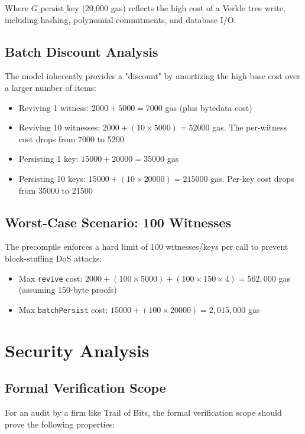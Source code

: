 \documentclass{article}
\begin{document}
Where $G\_{\text{persist\_key}}$ (20,000 gas) reflects the high cost of a Verkle tree write, including hashing, polynomial commitments, and database I/O.

\subsection{Batch Discount Analysis}

The model inherently provides a "discount" by amortizing the high base cost over a larger number of items:
\begin{itemize}
\item Reviving 1 witness: $2000 + 5000 = 7000$ gas (plus bytedata cost)
\item Reviving 10 witnesses: $2000 + (10 \times 5000) = 52000$ gas. The per-witness cost drops from 7000 to 5200
\item Persisting 1 key: $15000 + 20000 = 35000$ gas
\item Persisting 10 keys: $15000 + (10 \times 20000) = 215000$ gas. Per-key cost drops from 35000 to 21500
\end{itemize}

\subsection{Worst-Case Scenario: 100 Witnesses}

The precompile enforces a hard limit of 100 witnesses/keys per call to prevent block-stuffing DoS attacks:
\begin{itemize}
\item Max \texttt{revive} cost: $2000 + (100 \times 5000) + (100 \times 150 \times 4) = 562,000$ gas (assuming 150-byte proofs)
\item Max \texttt{batchPersist} cost: $15000 + (100 \times 20000) = 2,015,000$ gas
\end{itemize}

\section{Security Analysis}

\subsection{Formal Verification Scope}

For an audit by a firm like Trail of Bits, the formal verification scope should prove the following properties:
\end{document}
